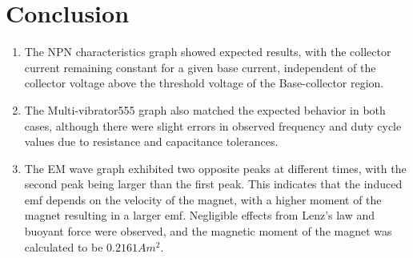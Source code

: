 \section{Conclusion}
	\begin{enumerate}
		\item The NPN characteristics graph showed expected results, with the collector current remaining constant for a given base current, independent of the collector voltage above the threshold voltage of the Base-collector region.
		\item The Multi-vibrator555 graph also matched the expected behavior in both cases, although there were slight errors in observed frequency and duty cycle values due to resistance and capacitance tolerances.
		\item The EM wave graph exhibited two opposite peaks at different times, with the second peak being larger than the first peak. This indicates that the induced emf depends on the velocity of the magnet, with a higher moment of the magnet resulting in a larger emf. Negligible effects from Lenz's law and buoyant force were observed, and the magnetic moment of the magnet was calculated to be $0.2161 Am^2$.
	\end{enumerate}